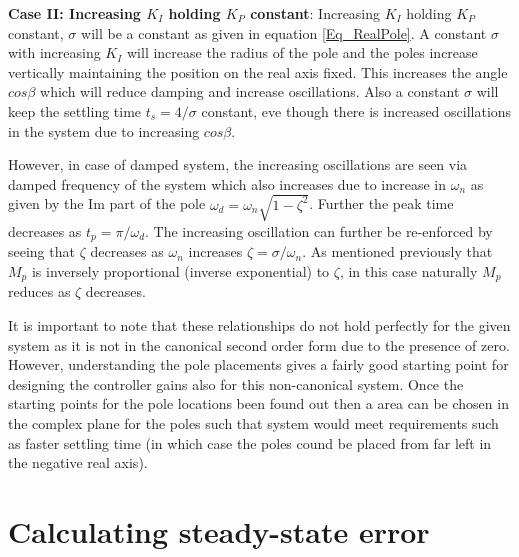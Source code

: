 \textbf{Case II: Increasing $K_I$ holding $K_P$ constant}:
Increasing $K_I$ holding $K_P$ constant, $\sigma$ will be a constant as given in equation \eqref{Eq_RealPole}. A constant $\sigma$ with increasing $K_I$ will increase the radius of the pole and the poles increase vertically maintaining the position on the real axis fixed. This increases the angle $cos{\beta}$ which will reduce damping and increase oscillations. Also a constant $\sigma$ will keep the settling time $t_s = 4/\sigma$ constant, eve though there is increased oscillations in the system due to increasing $cos{\beta}$.

However, in case of damped system, the increasing oscillations are seen via damped frequency of the system which also increases due to increase in $\omega_{n}$ as given by the Im part of the pole $\omega_{d} = \omega_{n} \sqrt{1 - \zeta^2}$. Further the peak time decreases as $t_p = \pi/\omega_{d}$. The increasing oscillation can further be re-enforced by seeing that $\zeta$ decreases as $\omega_{n}$ increases $\zeta = \sigma / \omega_{n}$. As mentioned previously that $M_p$ is inversely proportional (inverse exponential) to $\zeta$, in this case naturally $M_p$ reduces as $\zeta$ decreases.

It is important to note that these relationships do not hold perfectly for the given system as it is not in the canonical second order form due to the presence of zero. However, understanding the pole placements gives a fairly good starting point for designing the controller gains also for this non-canonical system. Once the starting points for the pole locations been found out then a area can be chosen in the complex plane for the poles such that system would meet requirements such as faster settling time (in which case the poles cound be placed from far left in the negative real axis).

\section{Calculating steady-state error}

